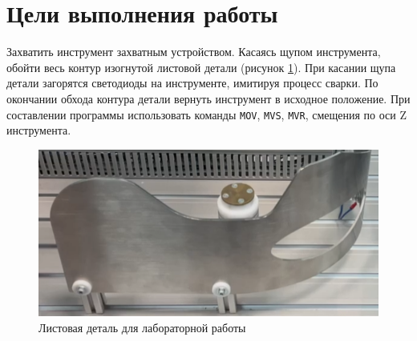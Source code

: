 \documentclass[a4paper, 12pt]{article}
\begin{document}
    \section{Цели выполнения работы}
    Захватить инструмент захватным устройством. Касаясь щупом
    инструмента, обойти весь контур изогнутой листовой детали (рисунок \ref{fig:stand}).
    При касании щупа детали загорятся светодиоды на инструменте,
    имитируя процесс сварки. По окончании обхода контура детали вернуть
    инструмент в исходное положение. При составлении программы
    использовать команды \texttt{MOV}, \texttt{MVS}, \texttt{MVR}, смещения по оси Z инструмента.
    \begin{figure}[H]
        \centering
        \includegraphics[scale=0.9]{stand.png}
        \captionsetup{skip=0pt}
        \caption{Листовая деталь для лабораторной работы}
        \label{fig:stand}
    \end{figure}
\end{document}
